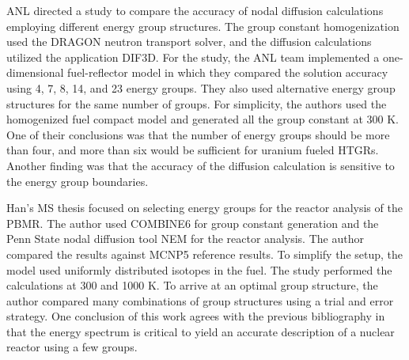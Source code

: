\gls{ANL} directed a study \cite{lee_status_2006} to compare the accuracy of nodal diffusion calculations employing different energy group structures.
The group constant homogenization used the DRAGON neutron transport solver, and the diffusion calculations utilized the application DIF3D.
For the study, the ANL team implemented a one-dimensional fuel-reflector model in which they compared the solution accuracy using 4, 7, 8, 14, and 23 energy groups.
They also used alternative energy group structures for the same number of groups.
For simplicity, the authors used the homogenized fuel compact model and generated all the group constant at 300 K.
One of their conclusions was that the number of energy groups should be more than four, and more than six would be sufficient for uranium fueled HTGRs.
Another finding was that the accuracy of the diffusion calculation is sensitive to the energy group boundaries.


Han's MS thesis \cite{han_sensitivity_2008} focused on selecting energy groups for the reactor analysis of the \gls{PBMR}.
The author used COMBINE6 \cite{grimesey_combinepc-portable_1994} for group constant generation and the Penn State nodal diffusion tool NEM \cite{bandini_three-dimensional_1990} for the reactor analysis.
The author compared the results against MCNP5 reference results.
To simplify the setup, the model used uniformly distributed isotopes in the fuel.
The study performed the calculations at 300 and 1000 K.
To arrive at an optimal group structure, the author compared many combinations of group structures using a trial and error strategy.
One conclusion of this work agrees with the previous bibliography \cite{gulf_oil_company_nuclear_1973} \cite{duderstadt_nuclear_1976} in that the energy spectrum is critical to yield an accurate description of a nuclear reactor using a few groups.

